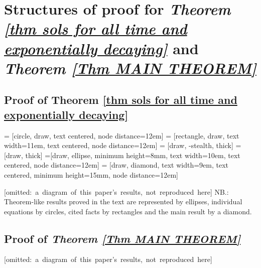 \documentclass{article}
\begin{document}
\newpage

\section{Structures of proof for 
\emph{Theorem \ref{thm sols for all time and exponentially decaying}} and \emph{Theorem \ref{Thm MAIN THEOREM}}}
\label{App flowcharts}

\subsection{Proof of Theorem \ref{thm sols for all time and exponentially decaying}}

 = [circle, draw, text centered, node distance=12em]
 = [rectangle, draw, text width=11em, text centered, node distance=12em]
 = [draw, -stealth, thick]
 = [draw, thick]
=[draw, ellipse, minimum height=8mm, text width=10em, text centered, node distance=12em]
 = [draw, diamond, text width=9em, text centered, minimum height=15mm, node distance=12em]


%
\mbox{[omitted: a diagram of this paper's results, not reproduced here]}
NB.: Theorem-like results proved in the text are represented by ellipses,  individual equations by circles, cited facts  by rectangles and the main result by a diamond.

\subsection{Proof of \emph{Theorem \ref{Thm MAIN THEOREM}}}

\vspace{-0.7em}
\mbox{[omitted: a diagram of this paper's results, not reproduced here]}


\newpage
\end{document}
